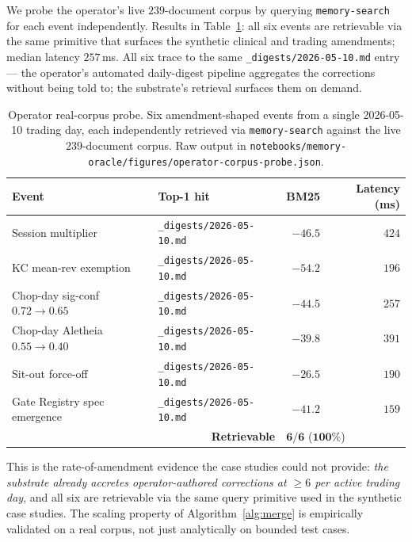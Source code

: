 \documentclass[runningheads]{llncs}
\begin{document}
We probe the operator's live $239$-document corpus by querying
\texttt{memory-search} for each event independently. Results in
Table~\ref{tab:operator-probe}: all six events are retrievable via the
same primitive that surfaces the synthetic clinical and trading
amendments; median latency $257$\,ms. All six trace to the same
\texttt{\_digests/2026-05-10.md} entry --- the operator's automated
daily-digest pipeline aggregates the corrections without being told to;
the substrate's retrieval surfaces them on demand.

\begin{table}[h]
\centering
\caption{Operator real-corpus probe. Six amendment-shaped events from a
         single 2026-05-10 trading day, each independently retrieved via
         \texttt{memory-search} against the live $239$-document corpus.
         Raw output in
         \texttt{notebooks/memory-oracle/figures/operator-corpus-probe.json}.}
\label{tab:operator-probe}
\small
\begin{tabular}{llrr}
\toprule
\textbf{Event} & \textbf{Top-1 hit} & \textbf{BM25} & \textbf{Latency (ms)} \\
\midrule
Session multiplier             & \texttt{\_digests/2026-05-10.md} & $-46.5$ & $424$ \\
KC mean-rev exemption          & \texttt{\_digests/2026-05-10.md} & $-54.2$ & $196$ \\
Chop-day sig-conf $0.72{\to}0.65$ & \texttt{\_digests/2026-05-10.md} & $-44.5$ & $257$ \\
Chop-day Aletheia $0.55{\to}0.40$ & \texttt{\_digests/2026-05-10.md} & $-39.8$ & $391$ \\
Sit-out force-off              & \texttt{\_digests/2026-05-10.md} & $-26.5$ & $190$ \\
Gate Registry spec emergence   & \texttt{\_digests/2026-05-10.md} & $-41.2$ & $159$ \\
\midrule
\multicolumn{2}{r}{\textbf{Retrievable}} & \multicolumn{2}{l}{$\mathbf{6/6}$ ($\mathbf{100\%}$)} \\
\bottomrule
\end{tabular}
\end{table}

This is the rate-of-amendment evidence the case studies could not provide:
\emph{the substrate already accretes operator-authored corrections at
$\geq 6$ per active trading day}, and all six are retrievable via the
same query primitive used in the synthetic case studies. The scaling
property of Algorithm~\ref{alg:merge} is empirically validated on a real
corpus, not just analytically on bounded test cases.
\end{document}
